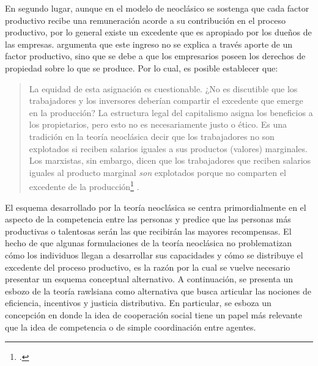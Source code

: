 En segundo lugar, aunque en el modelo de neoclásico se sostenga que cada factor productivo recibe una remuneración acorde a su contribución en el proceso productivo, por lo general existe un excedente que es apropiado por los dueños de las empresas. \citet{Roemer_2021a} argumenta que este ingreso no se explica a través aporte de un factor productivo, sino que se debe a que los empresarios poseen los derechos de propiedad sobre lo que se produce. Por lo cual, es posible establecer que:

\vspace{3mm}
\begin{quote}
    La equidad de esta asignación es cuestionable. ¿No es discutible que los trabajadores y los inversores deberían compartir el excedente que emerge en la producción? La estructura legal del capitalismo asigna los beneficios a los propietarios, pero esto no es necesariamente justo o ético. Es una tradición en la teoría neoclásica decir que los trabajadores no son explotados si reciben salarios iguales a sus productos (valores) marginales. Los marxistas, sin embargo, dicen que los trabajadores que reciben salarios iguales al producto marginal \textit{son} explotados porque no comparten el excedente de la producción\footnote{ \citep[p. 266]{Roemer_2021a}.} \citep[p. 266]{Roemer_2021a}.
\end{quote}
\vspace{3mm}


El esquema desarrollado por la teoría neoclásica se centra primordialmente en el aspecto de la competencia entre las personas y predice que las personas más productivas o talentosas serán las que recibirán las mayores recompensas. El hecho de que algunas formulaciones de la teoría neoclásica no problematizan cómo los individuos llegan a desarrollar sus capacidades y cómo se distribuye el excedente del proceso productivo, es la razón por la cual se vuelve necesario presentar un esquema conceptual alternativo. A continuación, se presenta un esbozo de la teoría rawlsiana como alternativa que busca articular las nociones de eficiencia, incentivos y justicia distributiva. En particular, se esboza un concepción en donde la idea de cooperación social tiene un papel más relevante que la idea de competencia o de simple coordinación entre agentes.


